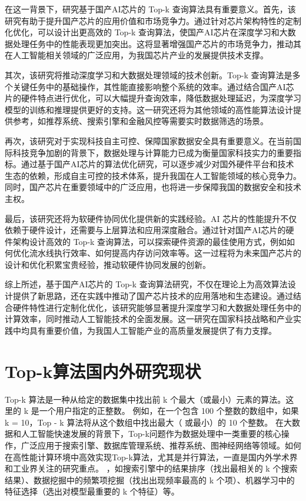 在这一背景下，研究基于国产AI芯片的 Top-k 查询算法具有重要意义。首先，该研究有助于提升国产芯片的应用价值和市场竞争力。通过针对芯片架构特性的定制化优化，可以设计出更高效的 Top-k 查询算法，使国产AI芯片在深度学习和大数据处理任务中的性能表现更加突出。这将显著增强国产芯片的市场竞争力，推动其在人工智能相关领域的广泛应用，为我国芯片产业的发展提供技术支撑。

其次，该研究将推动深度学习和大数据处理领域的技术创新。Top-k 查询算法是多个关键任务中的基础操作，其性能直接影响整个系统的效率。通过结合国产AI芯片的硬件特点进行优化，可以大幅提升查询效率，降低数据处理延迟，为深度学习模型的训练和推理提供更好的支持。这一研究还将为其他领域的高性能算法设计提供参考，如推荐系统、搜索引擎和金融风控等需要实时数据筛选的场景。

再次，该研究对于实现科技自主可控、保障国家数据安全具有重要意义。在当前国际科技竞争加剧的背景下，数据处理与计算能力已成为衡量国家科技实力的重要指标。通过基于国产AI芯片的算法优化研究，可以逐步减少对国外硬件平台和技术生态的依赖，形成自主可控的技术体系，提升我国在人工智能领域的核心竞争力。同时，国产芯片在重要领域中的广泛应用，也将进一步保障我国的数据安全和技术主权。

最后，该研究还将为软硬件协同优化提供新的实践经验。AI 芯片的性能提升不仅依赖于硬件设计，还需要与上层算法和应用深度融合。通过针对国产AI芯片的硬件架构设计高效的 Top-k 查询算法，可以探索硬件资源的最佳使用方式，例如如何优化流水线执行效率、如何提高内存访问效率等。这一过程将为未来国产芯片的设计和优化积累宝贵经验，推动软硬件协同发展的创新。

综上所述，基于国产AI芯片的 Top-k 查询算法研究，不仅在理论上为高效算法设计提供了新思路，还在实践中推动了国产芯片技术的应用落地和生态建设。通过结合硬件特性进行定制化优化，该研究能够显著提升深度学习和大数据处理任务中的计算效率，同时推动人工智能技术的全面发展。这一研究在国家科技战略和产业实践中均具有重要价值，为我国人工智能产业的高质量发展提供了有力支撑。

\section{Top-k算法国内外研究现状}

Top-k 算法是一种从给定的数据集中找出前 k 个最大（或最小）元素的算法。这里的 k 是一个用户指定的正整数。
例如，在一个包含 100 个整数的数组中，如果 k = 10，Top - k 算法将从这个数组中找出最大（
或最小）的 10 个整数。
在大数据和人工智能快速发展的背景下，Top-k问题作为数据处理中一类重要的核心操作，广泛应用于搜索引擎、数据库管理系统、推荐系统、图神经网络等领域。如何在高性能计算环境中高效实现Top-k算法，尤其是并行算法，一直是国内外学术界和工业界关注的研究重点。
，如搜索引擎中的结果排序（找出最相关的 k 个搜索结果）、数据挖掘中的频繁项挖掘（找出出现频率最高的 k 个项）、机器学习中的特征选择（选出对模型最重要的 k 个特征）等。

